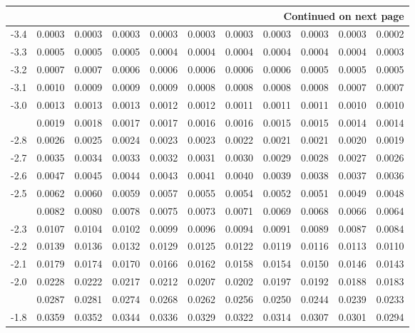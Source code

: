 \documentclass[12pt,a4paper]{article}
\begin{document}
\begin{enumerate}
\begin{center}
\begin{longtable}{ccccccccccc}
\midrule
\multicolumn{11}{r}{{Continued on next page}} \\
\bottomrule
\endfoot

\bottomrule\bottomrule
\endlastfoot

-3.4 & 0.0003 & 0.0003 & 0.0003 & 0.0003 & 0.0003 & 0.0003 & 0.0003 & 0.0003 & 0.0003 & 0.0002 \\
-3.3 & 0.0005 & 0.0005 & 0.0005 & 0.0004 & 0.0004 & 0.0004 & 0.0004 & 0.0004 & 0.0004 & 0.0003 \\
-3.2 & 0.0007 & 0.0007 & 0.0006 & 0.0006 & 0.0006 & 0.0006 & 0.0006 & 0.0005 & 0.0005 & 0.0005 \\
-3.1 & 0.0010 & 0.0009 & 0.0009 & 0.0009 & 0.0008 & 0.0008 & 0.0008 & 0.0008 & 0.0007 & 0.0007 \\
-3.0 & 0.0013 & 0.0013 & 0.0013 & 0.0012 & 0.0012 & 0.0011 & 0.0011 & 0.0011 & 0.0010 & 0.0010 \\
\addlinespace
-2.9 & 0.0019 & 0.0018 & 0.0017 & 0.0017 & 0.0016 & 0.0016 & 0.0015 & 0.0015 & 0.0014 & 0.0014 \\
-2.8 & 0.0026 & 0.0025 & 0.0024 & 0.0023 & 0.0023 & 0.0022 & 0.0021 & 0.0021 & 0.0020 & 0.0019 \\
-2.7 & 0.0035 & 0.0034 & 0.0033 & 0.0032 & 0.0031 & 0.0030 & 0.0029 & 0.0028 & 0.0027 & 0.0026 \\
-2.6 & 0.0047 & 0.0045 & 0.0044 & 0.0043 & 0.0041 & 0.0040 & 0.0039 & 0.0038 & 0.0037 & 0.0036 \\
-2.5 & 0.0062 & 0.0060 & 0.0059 & 0.0057 & 0.0055 & 0.0054 & 0.0052 & 0.0051 & 0.0049 & 0.0048 \\
\addlinespace
-2.4 & 0.0082 & 0.0080 & 0.0078 & 0.0075 & 0.0073 & 0.0071 & 0.0069 & 0.0068 & 0.0066 & 0.0064 \\
-2.3 & 0.0107 & 0.0104 & 0.0102 & 0.0099 & 0.0096 & 0.0094 & 0.0091 & 0.0089 & 0.0087 & 0.0084 \\
-2.2 & 0.0139 & 0.0136 & 0.0132 & 0.0129 & 0.0125 & 0.0122 & 0.0119 & 0.0116 & 0.0113 & 0.0110 \\
-2.1 & 0.0179 & 0.0174 & 0.0170 & 0.0166 & 0.0162 & 0.0158 & 0.0154 & 0.0150 & 0.0146 & 0.0143 \\
-2.0 & 0.0228 & 0.0222 & 0.0217 & 0.0212 & 0.0207 & 0.0202 & 0.0197 & 0.0192 & 0.0188 & 0.0183 \\
\addlinespace
-1.9 & 0.0287 & 0.0281 & 0.0274 & 0.0268 & 0.0262 & 0.0256 & 0.0250 & 0.0244 & 0.0239 & 0.0233 \\
-1.8 & 0.0359 & 0.0352 & 0.0344 & 0.0336 & 0.0329 & 0.0322 & 0.0314 & 0.0307 & 0.0301 & 0.0294 \\

\end{longtable}
\end{center}
\end{enumerate}
\end{document}
